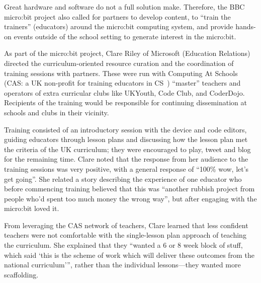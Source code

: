 Great hardware and software do not a full solution make. 
Therefore,
the BBC micro:bit project also called for partners to develop content,
to ``train the trainers'' (educators) around the micro:bit computing
system, and provide hands-on events outside of the school setting to
generate interest in the micro:bit.

As part of the micro:bit project, Clare Riley of Microsoft (Education Relations) directed the curriculum-oriented resource curation and the coordination of training sessions with partners. These were run with Computing At Schools (CAS: a UK non-profit for training educators in CS~\cite{crick2011computing}) ``master'' teachers and operators of extra curricular clubs like UKYouth, Code Club, and CoderDojo. Recipients of the training would be responsible for continuing dissemination at schools and clubs in their vicinity.



Training consisted of an introductory session with the device and code editors, guiding educators through lesson plans and discussing how the lesson plan met the criteria of the UK curriculum; they were encouraged to play, tweet and blog for the remaining time. Clare noted that the response from her audience to the training sessions was very positive, with a general response of ``100\% wow, let's get going''. She related a story describing the experience of one educator who before commencing training believed that this was ``another rubbish project from people who'd spent too much money the wrong way'', but after engaging with the micro:bit loved it. 

From leveraging the CAS network of teachers, Clare learned that less confident teachers were not comfortable with the single-lesson plan approach of teaching the curriculum. She explained that they ``wanted a 6 or 8 week block of stuff, which said `this is the scheme of work which will deliver these outcomes from the national curriculum''', rather than the individual lessons---they wanted more scaffolding.

